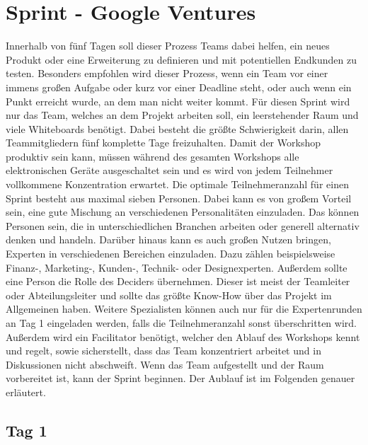 \section{Sprint - Google Ventures}
Innerhalb von fünf Tagen soll dieser Prozess Teams dabei helfen, ein neues Produkt oder eine Erweiterung zu definieren und mit potentiellen Endkunden zu testen. Besonders empfohlen wird dieser Prozess, wenn ein Team vor einer immens großen Aufgabe oder kurz vor einer Deadline steht, oder auch wenn ein Punkt erreicht wurde, an dem man nicht weiter kommt. Für diesen Sprint wird nur das Team, welches an dem Projekt arbeiten soll, ein leerstehender Raum und viele Whiteboards benötigt. Dabei besteht die größte Schwierigkeit darin, allen Teammitgliedern fünf komplette Tage freizuhalten. Damit der Workshop produktiv sein kann, müssen während des gesamten Workshops alle elektronischen Geräte ausgeschaltet sein und es wird von jedem Teilnehmer vollkommene Konzentration erwartet. Die optimale Teilnehmeranzahl für einen Sprint besteht aus maximal sieben Personen. Dabei kann es von großem Vorteil sein, eine gute Mischung an verschiedenen Personalitäten einzuladen. Das können Personen sein, die in unterschiedlichen Branchen arbeiten oder generell alternativ denken und handeln. Darüber hinaus kann es auch großen Nutzen bringen, Experten in verschiedenen Bereichen einzuladen. Dazu zählen beispielsweise Finanz-, Marketing-, Kunden-, Technik- oder Designexperten. Außerdem sollte eine Person die Rolle des Deciders übernehmen. Dieser ist meist der Teamleiter oder Abteilungsleiter und sollte das größte Know-How über das Projekt im Allgemeinen haben. Weitere Spezialisten können auch nur für die Expertenrunden an Tag 1 eingeladen werden, falls die Teilnehmeranzahl sonst überschritten wird. Außerdem wird ein Facilitator benötigt, welcher den Ablauf des Workshops kennt und regelt, sowie sicherstellt, dass das Team konzentriert arbeitet und in Diskussionen nicht abschweift. Wenn das Team aufgestellt und der Raum vorbereitet ist, kann der Sprint beginnen. Der Aublauf ist im Folgenden genauer erläutert.

\subsection*{Tag 1}
